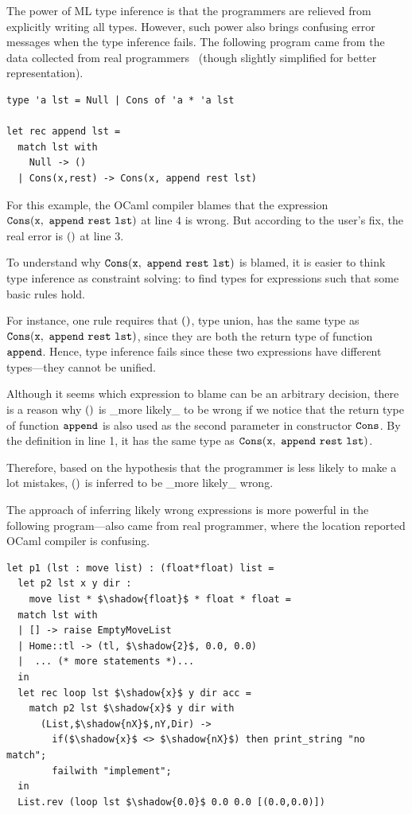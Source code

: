 The power of ML type inference is that the programmers are relieved
from explicitly writing all types. However, such power also brings
confusing error messages when the type inference fails. The following
program came from the data collected from real
programmers~\cite{lerner:pldi07} (though slightly simplified for
better representation).

\lstset{numbers=left, xleftmargin=15pt, framexleftmargin=15pt}
\begin{lstlisting}
type 'a lst = Null | Cons of 'a * 'a lst

let rec append lst =
  match lst with
    Null -> ()
  | Cons(x,rest) -> Cons(x, append rest lst)
\end{lstlisting}

For this example, the OCaml compiler blames that the expression
$\cod{Cons(x,\ append\ rest\ lst)}$ at line $4$ is wrong. But
according to the user's fix, the real error is $\mathtt{()}$ at line $3$.

To understand why $\cod{Cons(x,\ append\ rest\ lst)}$ is blamed, it
is easier to think type inference as constraint solving: to find types
for expressions such that some basic rules hold.

For instance, one rule requires that $\mathtt{(})$, type union, has the
same type as $\cod{Cons(x,\ append\ rest\ lst)}$, since they are both
the return type of function $\mathtt{append}$. Hence, type inference
fails since these two expressions have different types---they cannot
be unified.

Although it seems which expression to blame can be an arbitrary
decision, there is a reason why $\mathtt{(})$ is _more likely_ to be wrong
if we notice that the return type of function $\mathtt{append}$ is also
used as the second parameter in constructor $\mathtt{Cons}$.  By the
definition in line 1, it has the same type as $\mathtt{Cons(x,\ append\
rest\ lst)}$.

Therefore, based on the hypothesis that the programmer is less likely
to make a lot mistakes, $\mathtt{(})$ is inferred to be _more likely_
wrong.

The approach of inferring likely wrong expressions is more powerful in
the following program---also came from real programmer, where the
location reported OCaml compiler is confusing.

\begin{lstlisting}
let p1 (lst : move list) : (float*float) list = 
  let p2 lst x y dir : 
    move list * $\shadow{float}$ * float * float = 
  match lst with
  | [] -> raise EmptyMoveList
  | Home::tl -> (tl, $\shadow{2}$, 0.0, 0.0)
  |  ... (* more statements *)... 
  in
  let rec loop lst $\shadow{x}$ y dir acc =
    match p2 lst $\shadow{x}$ y dir with
      (List,$\shadow{nX}$,nY,Dir) -> 
        if($\shadow{x}$ <> $\shadow{nX}$) then print_string "no match";
        failwith "implement";
  in 
  List.rev (loop lst $\shadow{0.0}$ 0.0 0.0 [(0.0,0.0)])
\end{lstlisting}

